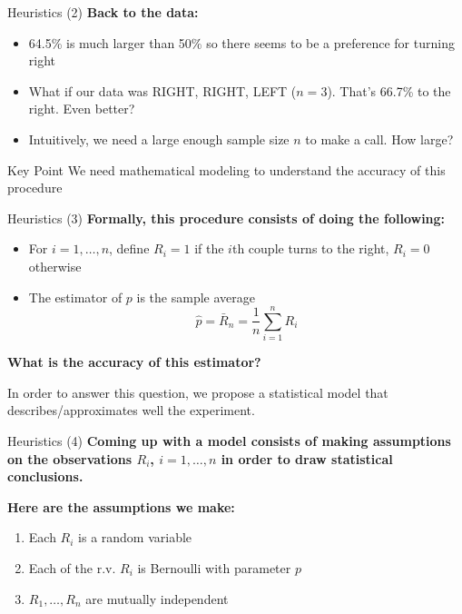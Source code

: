 \documentclass[aspectratio=169]{beamer}
\begin{document}
\begin{frame}{Heuristics (2)}
\textbf{Back to the data:}
\begin{itemize}
    \item 64.5\% is much larger than 50\% so there seems to be a preference for turning right
    \item What if our data was RIGHT, RIGHT, LEFT ($n = 3$). That's 66.7\% to the right. Even better?
    \item Intuitively, we need a large enough sample size $n$ to make a call. How large?
\end{itemize}

\vspace{1cm}

\begin{block}{Key Point}
We need mathematical modeling to understand the accuracy of this procedure
\end{block}
\end{frame}

\begin{frame}{Heuristics (3)}
\textbf{Formally, this procedure consists of doing the following:}
\begin{itemize}
    \item For $i = 1, \ldots, n$, define $R_i = 1$ if the $i$th couple turns to the right, $R_i = 0$ otherwise
    \item The estimator of $p$ is the sample average
    \[\hat{p} = \bar{R}_n = \frac{1}{n}\sum_{i=1}^{n}R_i\]
\end{itemize}

\vspace{0.5cm}

\textbf{What is the accuracy of this estimator?}

\vspace{0.3cm}

In order to answer this question, we propose a statistical model that describes/approximates well the experiment.
\end{frame}

\begin{frame}{Heuristics (4)}
\textbf{Coming up with a model consists of making assumptions on the observations $R_i$, $i = 1, \ldots, n$ in order to draw statistical conclusions.}

\vspace{0.5cm}

\textbf{Here are the assumptions we make:}
\begin{enumerate}
    \item Each $R_i$ is a random variable
    \item Each of the r.v. $R_i$ is Bernoulli with parameter $p$
    \item $R_1, \ldots, R_n$ are mutually independent
\end{enumerate}
\end{frame}
\end{document}
